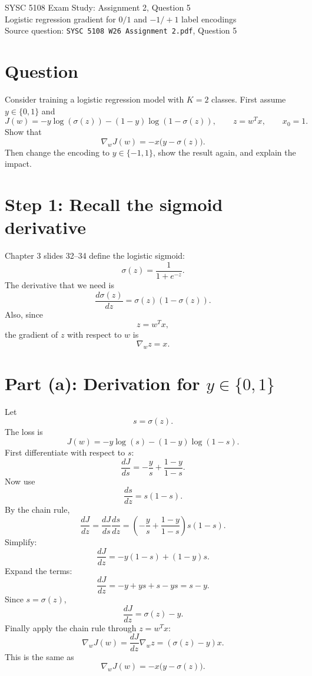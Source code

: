 \documentclass[11pt]{article}
\begin{document}
\begin{center}
{\Large SYSC 5108 Exam Study: Assignment 2, Question 5}\\
\vspace{0.3em}
{\large Logistic regression gradient for $0/1$ and $-1/+1$ label encodings}\\
\vspace{0.3em}
Source question: \texttt{SYSC 5108 W26 Assignment 2.pdf}, Question 5
\end{center}

\section*{Question}

Consider training a logistic regression model with $K=2$ classes. First assume $y\in\{0,1\}$ and
\[
J(w)=-y\log(\sigma(z))-(1-y)\log(1-\sigma(z)),
\qquad
z=w^T x,\qquad x_0=1.
\]
Show that
\[
\nabla_w J(w)=-x\bigl(y-\sigma(z)\bigr).
\]
Then change the encoding to $y\in\{-1,1\}$, show the result again, and explain the impact.

\section*{Step 1: Recall the sigmoid derivative}

Chapter 3 slides 32--34 define the logistic sigmoid:
\[
\sigma(z)=\frac{1}{1+e^{-z}}.
\]
The derivative that we need is
\[
\frac{d\sigma(z)}{dz}=\sigma(z)(1-\sigma(z)).
\]
Also, since
\[
z=w^T x,
\]
the gradient of $z$ with respect to $w$ is
\[
\nabla_w z=x.
\]

\section*{Part (a): Derivation for $y\in\{0,1\}$}

Let
\[
s=\sigma(z).
\]
The loss is
\[
J(w)=-y\log(s)-(1-y)\log(1-s).
\]
First differentiate with respect to $s$:
\[
\frac{dJ}{ds}
=-\frac{y}{s}+\frac{1-y}{1-s}.
\]
Now use
\[
\frac{ds}{dz}=s(1-s).
\]
By the chain rule,
\[
\frac{dJ}{dz}
=
\frac{dJ}{ds}\frac{ds}{dz}
=
\left(-\frac{y}{s}+\frac{1-y}{1-s}\right)s(1-s).
\]
Simplify:
\[
\frac{dJ}{dz}
=
-y(1-s)+(1-y)s.
\]
Expand the terms:
\[
\frac{dJ}{dz}
=-y+ys+s-ys=s-y.
\]
Since $s=\sigma(z)$,
\[
\frac{dJ}{dz}=\sigma(z)-y.
\]
Finally apply the chain rule through $z=w^T x$:
\[
\nabla_w J(w)
=
\frac{dJ}{dz}\nabla_w z
=
(\sigma(z)-y)x.
\]
This is the same as
\[
\boxed{
\nabla_w J(w)
=
-x\bigl(y-\sigma(z)\bigr)
}.
\]
\end{document}
